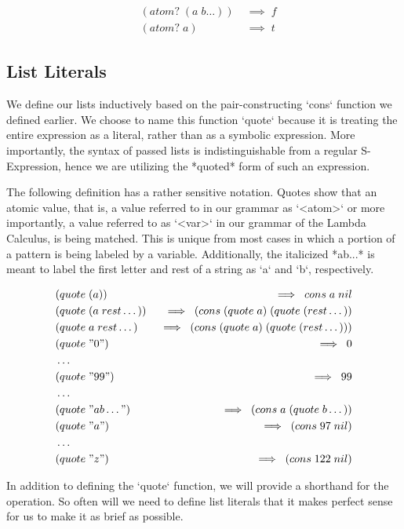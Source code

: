 \begin{align*}
& (atom? \; (a \; b\dots)) \; &\implies \; f
\\& (atom? \; a) \; &\implies \; t
\end{align*}

\subsection{List Literals}
We define our lists inductively based on the pair-constructing `cons` function we 
defined earlier. We choose to name this function `quote` because it is treating 
the entire expression as a literal, rather than as a symbolic expression. More 
importantly, the syntax of passed lists is indistinguishable from a regular 
S-Expression, hence we are utilizing the *quoted* form of such an expression.

The following definition has a rather sensitive notation. Quotes show that an 
atomic value, that is, a value referred to in our grammar as `<atom>` or more 
importantly, a value referred to as `<var>` in our grammar of the Lambda Calculus, 
is being matched. This is unique from most cases in which a portion of a pattern 
is being labeled by a variable. Additionally, the italicized *ab...* is meant to 
label the first letter and rest of a string as `a` and `b`, respectively.

\begin{align*}
& (quote \; (a)) \; &\implies \; cons \; a \; nil
\\& (quote \; (a \; rest\dots)) \; &\implies \; (cons \; (quote \; a) \; (quote \; (rest\dots))
\\& (quote \; a \; rest\dots) \; &\implies \; (cons \; (quote \; a) \; (quote \; (rest\dots)))
\\& (quote \; "0") \; &\implies \; 0
\\& \dots
\\& (quote \; "99") \; &\implies \; 99
\\& \dots
\\& (quote \; "ab\dots") \; &\implies \; (cons \; a \; (quote \; b\dots))
\\& (quote \; "a") \; &\implies \; (cons \; 97 \; nil)
\\& \dots
\\& (quote \; "z") \; &\implies \; (cons \; 122 \; nil)
\end{align*}

In addition to defining the `quote` function, we will provide a shorthand for the 
operation. So often will we need to define list literals that it makes perfect 
sense for us to make it as brief as possible.


